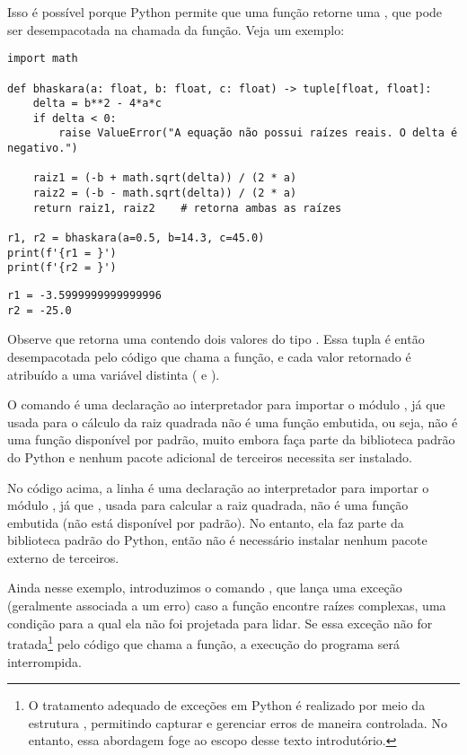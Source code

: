 Isso é possível porque Python permite que uma função retorne uma , que pode ser desempacotada na chamada
da função.
Veja um exemplo:
\begin{verbatim}
import math

def bhaskara(a: float, b: float, c: float) -> tuple[float, float]:
    delta = b**2 - 4*a*c
    if delta < 0:
        raise ValueError("A equação não possui raízes reais. O delta é negativo.")

    raiz1 = (-b + math.sqrt(delta)) / (2 * a)
    raiz2 = (-b - math.sqrt(delta)) / (2 * a)
    return raiz1, raiz2    # retorna ambas as raízes

r1, r2 = bhaskara(a=0.5, b=14.3, c=45.0)
print(f'{r1 = }')
print(f'{r2 = }')
\end{verbatim}
\begin{verbatim}
r1 = -3.5999999999999996
r2 = -25.0
\end{verbatim}

Observe que  retorna uma  contendo dois valores do tipo .
Essa tupla é então desempacotada pelo código que chama a função, e cada valor retornado é atribuído a uma
variável distinta ( e ).

O comando  é uma declaração ao interpretador para importar o módulo , já que
 usada para o cálculo da raiz quadrada não é uma função embutida, ou seja, não é uma função disponível
por padrão, muito embora faça parte da biblioteca padrão do Python e nenhum pacote adicional de terceiros
necessita ser instalado.

No código acima, a linha  é uma declaração ao interpretador para importar o módulo ,
já que , usada para calcular a raiz quadrada, não é uma função embutida (não está disponível por padrão).
No entanto, ela faz parte da biblioteca padrão do Python, então não é necessário instalar nenhum pacote externo de terceiros.

Ainda nesse exemplo, introduzimos o comando , que lança uma exceção (geralmente associada a um erro)
caso a função encontre raízes complexas, uma condição para a qual ela não foi projetada para lidar.
Se essa exceção não for tratada\footnote{O tratamento adequado de exceções em Python é realizado por meio da estrutura , permitindo capturar
e gerenciar erros de maneira controlada.
No entanto, essa abordagem foge ao escopo desse texto introdutório.} pelo código que chama a função, a execução do programa será interrompida.


